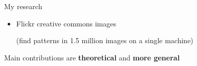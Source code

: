 {\begin{frame}{My research}
\begin{itemize}
\pause
\vspace{-0.4cm}
\item
Flickr creative commons images

(find patterns in 1.5 million images on a single machine)
\end{itemize}

\vspace{-0.8cm}

\pause
\vspace{-0.15in}
Main contributions are \textbf{theoretical} and \textbf{more general}
\end{frame}
}
